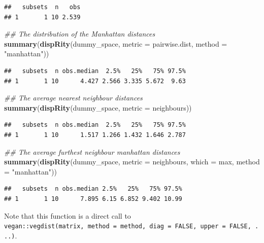 \documentclass[
]{book}
\newenvironment{Shaded}{\begin{snugshade}}{\end{snugshade}}
\newcommand{\CommentTok}[1]{\textcolor[rgb]{0.56,0.35,0.01}{\textit{#1}}}
\newcommand{\DataTypeTok}[1]{\textcolor[rgb]{0.13,0.29,0.53}{#1}}
\newcommand{\KeywordTok}[1]{\textcolor[rgb]{0.13,0.29,0.53}{\textbf{#1}}}
\newcommand{\NormalTok}[1]{#1}
\newcommand{\StringTok}[1]{\textcolor[rgb]{0.31,0.60,0.02}{#1}}
\begin{document}
\begin{verbatim}
##   subsets  n   obs
## 1       1 10 2.539
\end{verbatim}

\begin{Shaded}
\begin{Highlighting}[]
\CommentTok{\#\# The distribution of the Manhattan distances}
\KeywordTok{summary}\NormalTok{(}\KeywordTok{dispRity}\NormalTok{(dummy\_space, }\DataTypeTok{metric =}\NormalTok{ pairwise.dist,}
                 \DataTypeTok{method =} \StringTok{"manhattan"}\NormalTok{))}
\end{Highlighting}
\end{Shaded}

\begin{verbatim}
##   subsets  n obs.median  2.5%   25%   75% 97.5%
## 1       1 10      4.427 2.566 3.335 5.672  9.63
\end{verbatim}

\begin{Shaded}
\begin{Highlighting}[]
\CommentTok{\#\# The average nearest neighbour distances}
\KeywordTok{summary}\NormalTok{(}\KeywordTok{dispRity}\NormalTok{(dummy\_space, }\DataTypeTok{metric =}\NormalTok{ neighbours))}
\end{Highlighting}
\end{Shaded}

\begin{verbatim}
##   subsets  n obs.median  2.5%   25%   75% 97.5%
## 1       1 10      1.517 1.266 1.432 1.646 2.787
\end{verbatim}

\begin{Shaded}
\begin{Highlighting}[]
\CommentTok{\#\# The average furthest neighbour manhattan distances}
\KeywordTok{summary}\NormalTok{(}\KeywordTok{dispRity}\NormalTok{(dummy\_space, }\DataTypeTok{metric =}\NormalTok{ neighbours,}
                 \DataTypeTok{which =}\NormalTok{ max, }\DataTypeTok{method =} \StringTok{"manhattan"}\NormalTok{))}
\end{Highlighting}
\end{Shaded}

\begin{verbatim}
##   subsets  n obs.median 2.5%   25%   75% 97.5%
## 1       1 10      7.895 6.15 6.852 9.402 10.99
\end{verbatim}

Note that this function is a direct call to \texttt{vegan::vegdist(matrix,\ method\ =\ method,\ diag\ =\ FALSE,\ upper\ =\ FALSE,\ ...)}.
\end{document}
